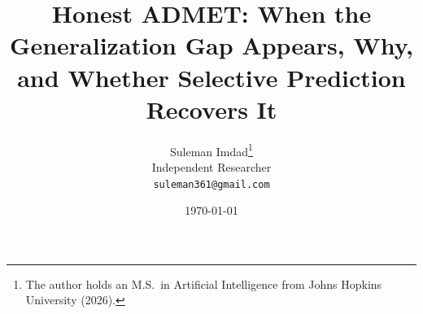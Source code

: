 \documentclass[11pt]{article}
\title{\textbf{Honest ADMET: When the Generalization Gap Appears, Why,\\
and Whether Selective Prediction Recovers It}}
\author{Suleman Imdad\thanks{The author holds an M.S.\ in Artificial Intelligence from Johns Hopkins University (2026).}\\\small Independent Researcher\\\small \texttt{suleman361@gmail.com}}
\date{\today}
\begin{document}
\maketitle
\begin{abstract}
\noindent 
\end{abstract}

\end{document}
